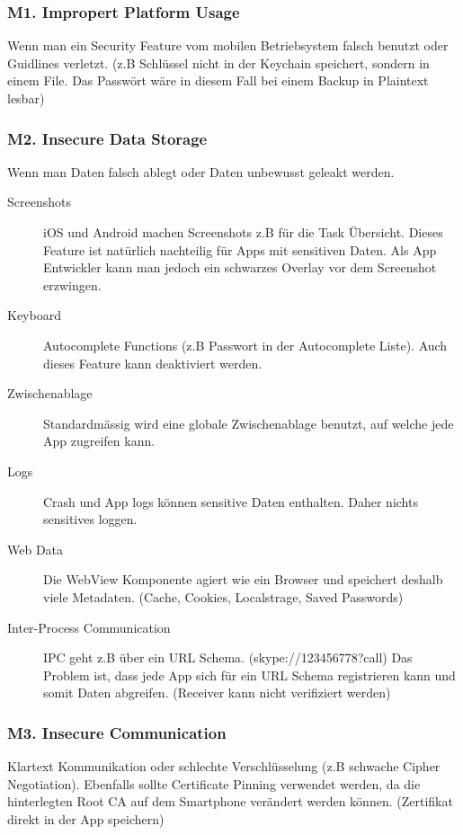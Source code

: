\subsubsection{M1. Impropert Platform Usage}
Wenn man ein Security Feature vom mobilen Betriebsystem falsch benutzt oder Guidlines verletzt. (z.B Schlüssel nicht in der Keychain speichert, sondern in einem File. Das Passwört wäre in diesem Fall bei einem Backup in Plaintext lesbar)

\subsubsection{M2. Insecure Data Storage}
Wenn man Daten falsch ablegt oder Daten unbewusst geleakt werden.
\begin{description}
	\item[Screenshots] iOS und Android machen Screenshots z.B für die Task Übersicht. Dieses Feature ist natürlich nachteilig für Apps mit sensitiven Daten. Als App Entwickler kann man jedoch ein schwarzes Overlay vor dem Screenshot erzwingen.
	\item[Keyboard] Autocomplete Functions (z.B Passwort in der Autocomplete Liste). Auch dieses Feature kann deaktiviert werden.
	\item[Zwischenablage] Standardmässig wird eine globale Zwischenablage benutzt, auf welche jede App zugreifen kann.
	\item[Logs] Crash und App logs können sensitive Daten enthalten. Daher nichts sensitives loggen.
	\item[Web Data] Die WebView Komponente agiert wie ein Browser und speichert deshalb viele Metadaten. (Cache, Cookies, Localstrage, Saved Passwords)
	\item[Inter-Process Communication] IPC geht z.B über ein URL Schema. (skype://123456778?call) Das Problem ist, dass jede App sich für ein URL Schema registrieren kann und somit Daten abgreifen. (Receiver kann nicht verifiziert werden)
\end{description}

\subsubsection{M3. Insecure Communication}
Klartext Kommunikation oder schlechte Verschlüsselung (z.B schwache Cipher Negotiation). Ebenfalls sollte Certificate Pinning verwendet werden, da die hinterlegten Root CA auf dem Smartphone verändert werden können. (Zertifikat direkt in der App speichern)

